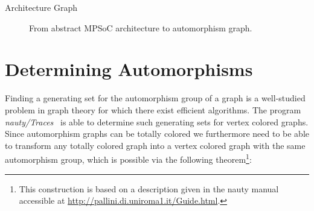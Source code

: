 \begin{exmp}[label=exmp:arch_graph]{Architecture Graph}
\begin{figure}[H]
\begin{subfigure}{.3\textwidth}
      \caption{}
      \label{fig:tcol_simple_arch_graph}
    \end{subfigure}
    \caption{From abstract MPSoC architecture to automorphism graph.}
  \end{figure}
\end{exmp}

\section{Determining Automorphisms}
\label{sec:ag_determining_automorphisms}

Finding a generating set for the automorphism group of a graph is a
well-studied problem in graph theory for which there exist efficient
algorithms. The program \textit{nauty/Traces}~\cite{nauty} is able to determine
such generating sets for vertex colored graphs. Since automorphism graphs can
be totally colored we furthermore need to be able to transform any totally
colored graph into a vertex colored graph with the same automorphism group,
which is possible via the following theorem\footnote{This construction is based
on a description given in the nauty manual accessible at
\url{http://pallini.di.uniroma1.it/Guide.html}.}:

